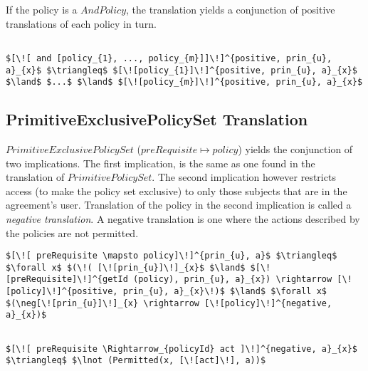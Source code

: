 If the policy is a $AndPolicy$, the translation yields a conjunction of positive translations of each policy in turn.

\lstset{mathescape, language=AST}  
\begin{lstlisting}[frame=single, caption={Positive Policy Translation {$\colon$} List of policies},label={lst:transpolicypositiveListOfPolicies}]

$[\![ and [policy_{1}, ..., policy_{m}]]\!]^{positive, prin_{u}, a}_{x}$ $\triangleq$ $[\![policy_{1}]\!]^{positive, prin_{u}, a}_{x}$ $\land$ $...$ $\land$ $[\![policy_{m}]\!]^{positive, prin_{u}, a}_{x}$

\end{lstlisting}


\subsection{PrimitiveExclusivePolicySet Translation}
$PrimitiveExclusivePolicySet$ ($preRequisite \mapsto policy$) yields the conjunction of two implications. The first implication, is the same as one found in the translation of $PrimitivePolicySet$. The second implication however restricts access (to make the policy set exclusive) to only those subjects that are in the agreement's user. Translation of the policy in the second implication is called a \emph{negative translation}. A negative translation is one where the actions described by the policies are not permitted. 


\lstset{mathescape, language=AST}  
\begin{lstlisting}[frame=single, caption={Policy Set Translation {$\colon$} PrimitiveExclusivePolicySet},label={lst:transpolicyformulaPrimitiveExclusivePolicySet}]
$[\![ preRequisite \mapsto policy]\!]^{prin_{u}, a}$ $\triangleq$ $\forall x$ $(\!( [\![prin_{u}]\!]_{x}$ $\land$ $[\![preRequisite]\!]^{getId (policy), prin_{u}, a}_{x}) \rightarrow [\![policy]\!]^{positive, prin_{u}, a}_{x}\!)$ $\land$ $\forall x$ $(\neg[\![prin_{u}]\!]_{x} \rightarrow [\![policy]\!]^{negative, a}_{x})$
\end{lstlisting}


\lstset{mathescape, language=AST}  
\begin{lstlisting}[frame=single, caption={Negative Policy Translation {$\colon$} Single policy},label={lst:transpolicynegativeSingle}]

$[\![ preRequisite \Rightarrow_{policyId} act ]\!]^{negative, a}_{x}$ $\triangleq$ $\lnot (Permitted(x, [\![act]\!], a))$
\end{lstlisting}


